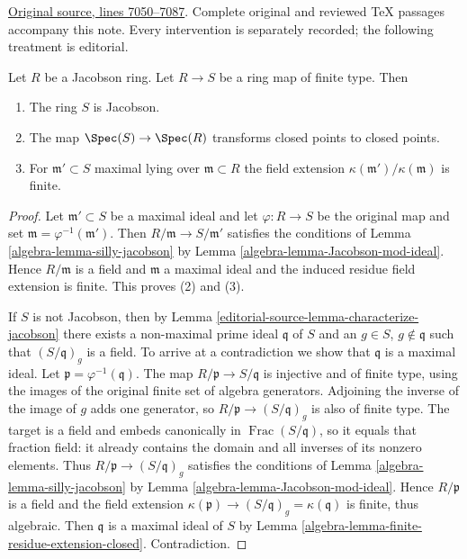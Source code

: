 \hypertarget{algebra-context-064}{}

\noindent\href{https://github.com/stacks/stacks-project/blob/a04446e57ec1fbc252a871afcec7752fb2807b14/algebra.tex\#L7050}{Original source, lines 7050--7087}. Complete original and reviewed TeX passages accompany this note. Every intervention is separately recorded; the following treatment is editorial.


\begin{proposition}
\label{editorial-source-proposition-Jacobson-permanence}
Let $R$ be a Jacobson ring. Let $R \to S$ be a
ring map of finite type. Then
\begin{enumerate}
\item The ring $S$ is Jacobson.
\item The map $\Spec(S) \to \Spec(R)$ transforms
closed points to closed points.
\item For $\mathfrak m' \subset S$ maximal lying over $\mathfrak m \subset R$
the field extension $\kappa(\mathfrak m')/\kappa(\mathfrak m)$
is finite.
\end{enumerate}
\end{proposition}

\begin{proof}
Let $\mathfrak m' \subset S$ be a maximal ideal and
let $\varphi:R\to S$ be the original map and set
$\mathfrak m=\varphi^{-1}(\mathfrak m')$.
Then $R/\mathfrak m \to S/\mathfrak m'$ satisfies
the conditions of Lemma \ref{algebra-lemma-silly-jacobson}
by Lemma \ref{algebra-lemma-Jacobson-mod-ideal}.
Hence $R/\mathfrak m$ is a field and
$\mathfrak m$ a maximal ideal and the induced
residue field extension is finite. This proves (2) and (3).  

\medskip\noindent
If $S$ is not Jacobson, then by Lemma \ref{editorial-source-lemma-characterize-jacobson} there
exists a non-maximal prime ideal $\mathfrak q$ of $S$ and an
$g \in S$, $g \not\in \mathfrak q$ such that $(S/\mathfrak q)_g$ is a field.
To arrive at a contradiction we show that $\mathfrak q$ is a maximal ideal.
Let $\mathfrak p=\varphi^{-1}(\mathfrak q)$.
The map $R/\mathfrak p\to S/\mathfrak q$ is injective and of finite
type, using the images of the original finite set of algebra generators.
Adjoining the inverse of the image of $g$ adds one generator, so
$R/\mathfrak p\to(S/\mathfrak q)_g$ is also of finite type.
The target is a field and embeds canonically in
$\operatorname{Frac}(S/\mathfrak q)$, so it equals that fraction
field: it already contains the domain and all inverses of its nonzero
elements. Thus
$R/\mathfrak p \to (S/\mathfrak q)_g$ satisfies the conditions of
Lemma \ref{algebra-lemma-silly-jacobson} by
Lemma \ref{algebra-lemma-Jacobson-mod-ideal}.
Hence $R/\mathfrak p$ is a field and the field extension
$\kappa(\mathfrak p) \to (S/\mathfrak q)_g = \kappa(\mathfrak q)$ is
finite, thus algebraic. Then $\mathfrak q$ is a maximal ideal of $S$ by
Lemma \ref{algebra-lemma-finite-residue-extension-closed}. Contradiction.
\end{proof}


